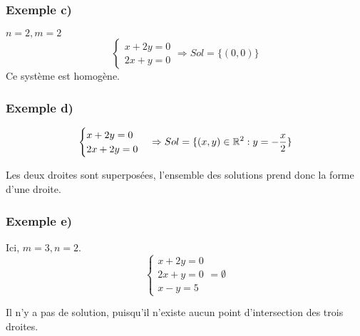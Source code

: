 \documentclass[12pt]{article}
\begin{document}
\subsubsection*{Exemple c)}
$n=2, m=2$
$$
\begin{cases}
    x+2y = 0 \\
    2x+y= 0
\end{cases} \Rightarrow Sol = \{(0,0)\}
$$
Ce système est homogène. 
\begin{center}
\end{center}
\pagebreak
\subsubsection*{Exemple d)}
$$
\begin{cases}
    x+2y=0
    \\
    2x+2y=0
\end{cases} \Rightarrow Sol = \{(x,y) \in \mathbb{R}^2 : y = - \frac{x}{2}\}
$$
\begin{center}
\end{center}
Les deux droites sont superposées, l'ensemble des solutions prend donc la forme d'une droite.
\pagebreak
\subsubsection*{Exemple e)}
Ici, $m=3, n=2$.
$$
\begin{cases}
    x+2y = 0
    \\
    2x+y = 0
    \\
    x-y = 5
\end{cases} = \emptyset    
$$

\begin{center}
\end{center}
Il n'y a pas de solution, puisqu'il n'existe aucun point d'intersection des trois droites.
\end{document}
